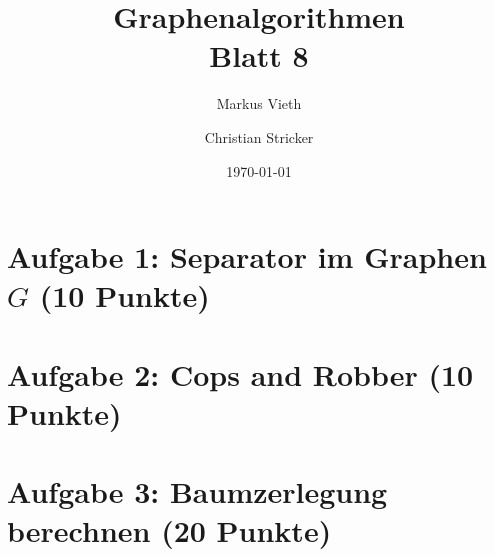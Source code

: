\documentclass[a4paper,11pt,twoside]{scrartcl}
\title{Graphenalgorithmen\\ Blatt 8}
\author{Markus Vieth\and Christian Stricker}
\date{\today}
\begin{document}
\maketitle
\cleardoublepage
\pagestyle{myheadings}

\newpage
\section{Aufgabe 1: Separator im Graphen $G$ (10 Punkte)}
\section{Aufgabe 2: Cops and Robber (10 Punkte)}
\section{Aufgabe 3: Baumzerlegung berechnen (20 Punkte)}
\end{document}
